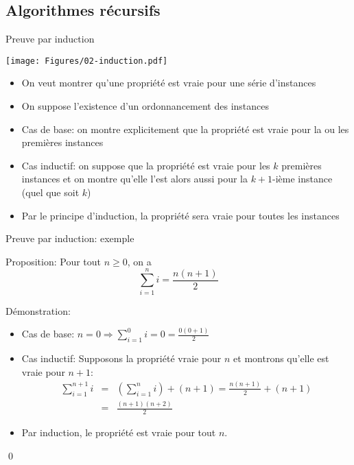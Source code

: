 \subsection{Algorithmes récursifs}


\begin{frame}{Preuve par induction}

\centerline{\texttt{[image: Figures/02-induction.pdf]}}

\begin{itemize}
\item On veut montrer qu'une propriété est vraie pour une série d'instances
\item On suppose l'existence d'un ordonnancement des instances
\item \alert{Cas de base:} on montre explicitement que la propriété est vraie pour la ou les premières instances
\item \alert{Cas inductif:} on suppose que la propriété est vraie pour les $k$ premières instances et on montre qu'elle l'est alors aussi pour la $k+1$-ième instance (quel que soit $k$)
\item Par le principe d'induction, la propriété sera vraie pour toutes les instances
\end{itemize}


\end{frame}

\begin{frame}{Preuve par induction: exemple}

Proposition: Pour tout $n\geq 0$, on a $$\sum_{i=1}^n i=\frac{n(n+1)}{2}$$

Démonstration:
\begin{itemize}
\item Cas de base: $n=0\Rightarrow \sum_{i=1}^0 i=0=\frac{0(0+1)}{2}$
\item Cas inductif: Supposons la propriété vraie pour $n$ et montrons qu'elle est vraie pour $n+1$:
\begin{eqnarray*}
\sum_{i=1}^{n+1} i &= &\left(\sum_{i=1}^n i\right) + (n+1)=\frac{n(n+1)}{2}+(n+1)\\
&=& \frac{(n+1)(n+2)}{2}
\end{eqnarray*}
\item Par induction, le propriété est vraie pour tout $n$.
\end{itemize}\qed

\end{frame}


